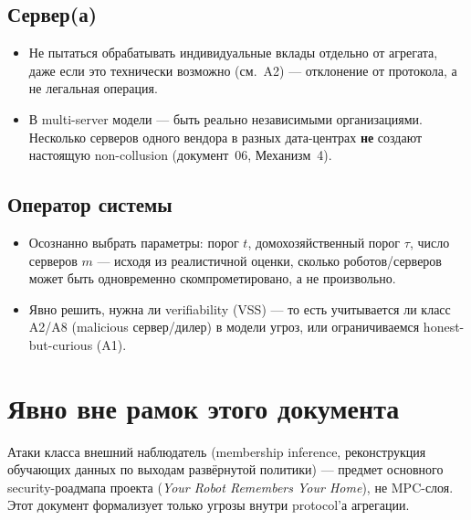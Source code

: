 \documentclass[11pt]{article}
\begin{document}
\subsection*{Сервер(а)}
\begin{itemize}
  \item Не пытаться обрабатывать индивидуальные вклады отдельно от агрегата, даже
    если это технически возможно (см.\ A2) — отклонение от протокола, а не
    легальная операция.
  \item В multi-server модели — быть реально независимыми организациями. Несколько
    серверов одного вендора в разных дата-центрах \textbf{не} создают настоящую
    non-collusion (документ~06, Механизм~4).
\end{itemize}

\subsection*{Оператор системы}
\begin{itemize}
  \item Осознанно выбрать параметры: порог $t$, домохозяйственный порог $\tau$,
    число серверов $m$ — исходя из реалистичной оценки, сколько роботов/серверов
    может быть одновременно скомпрометировано, а не произвольно.
  \item Явно решить, нужна ли verifiability (VSS) — то есть учитывается ли класс
    A2/A8 (malicious сервер/дилер) в модели угроз, или ограничиваемся
    honest-but-curious (A1).
\end{itemize}

\section{Явно вне рамок этого документа}

Атаки класса \guillemotleft внешний наблюдатель\guillemotright{} (membership
inference, реконструкция обучающих данных по выходам развёрнутой политики) —
предмет основного security-роадмапа проекта (\emph{Your Robot Remembers Your
Home}), не MPC-слоя. Этот документ формализует только угрозы внутри protocol'а
агрегации.
\end{document}
